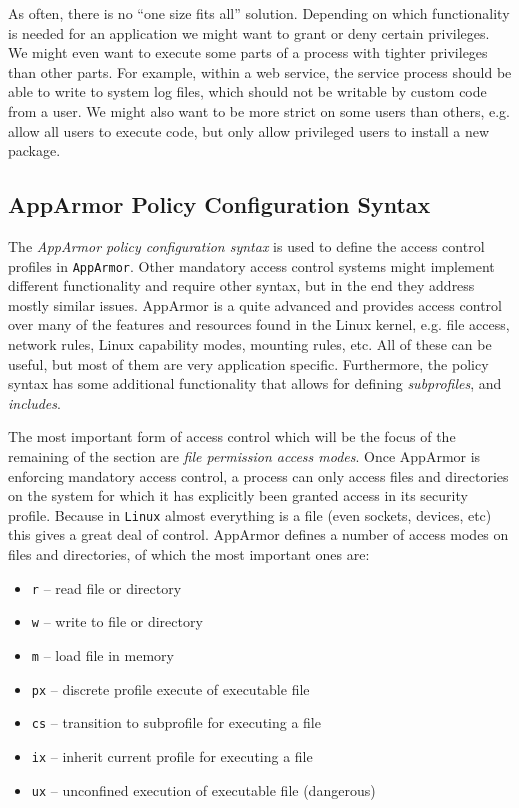 \documentclass[article]{jss}
\begin{document}
As often, there is no ``one size fits all'' solution. Depending on which
functionality is needed for an application we might want to grant or deny
certain privileges. We might even want to execute some parts of a process with
tighter privileges than other parts. For example, within a web service, the
service process should be able to write to system log files, which should not be
writable by custom code from a user. We might also want to be more strict on
some users than others, e.g. allow all users to execute code, but only allow
privileged users to install a new package.

\subsection{AppArmor Policy Configuration Syntax}
\label{syntax}

The \emph{AppArmor policy configuration syntax} is used to define the access
control profiles in \texttt{AppArmor}. Other mandatory access control systems
might implement different functionality and require other syntax, but in the end
they address mostly similar issues. AppArmor is a quite advanced and provides
access control over many of the features and resources found in the Linux
kernel, e.g. file access, network rules, Linux capability modes, mounting
rules, etc. All of these can be useful, but most of them are very application
specific. Furthermore, the policy syntax has some additional functionality that
allows for defining \emph{subprofiles}, and \emph{includes}.

The most important form of access control which will be the focus of the
remaining of the section are \emph{file permission access modes}. Once AppArmor
is enforcing mandatory access control, a process can only access files and
directories on the system for which it has explicitly been granted access in
its security profile. Because in \texttt{Linux} almost everything is a file
(even sockets, devices, etc) this gives a great deal of control. AppArmor
defines a number of access modes on files and directories, of which the most
important ones are:

\begin{itemize}
  \item[] \texttt{r} -- read file or directory
  \item[] \texttt{w} -- write to file or directory
  \item[] \texttt{m} -- load file in memory
  \item[] \texttt{px} -- discrete profile execute of executable file
  \item[] \texttt{cs} -- transition to subprofile for executing a file
  \item[] \texttt{ix} -- inherit current profile for executing a file
  \item[] \texttt{ux} -- unconfined execution of executable file (dangerous)
\end{itemize}
\end{document}
